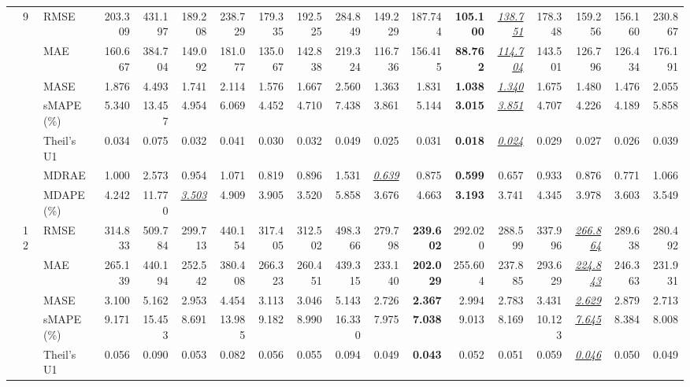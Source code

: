 \begin{table}[!htbp]
{\begin{tabular}{lllrrrrrrrrrrrrrrr}
\cmidrule(lr){2-18}
 & 9 & RMSE & 203.309 & 431.197 & 189.208 & 238.729 & 179.335 & 192.525 & 284.849 & 149.229 & 187.744 & \textbf{105.100} & \underline{\textit{138.751}} & 178.348 & 159.256 & 156.160 & 230.867 \\
 &  & MAE & 160.667 & 384.704 & 149.092 & 181.077 & 135.067 & 142.838 & 219.324 & 116.736 & 156.415 & \textbf{88.762} & \underline{\textit{114.704}} & 143.501 & 126.796 & 126.434 & 176.191 \\
 &  & MASE & 1.876 & 4.493 & 1.741 & 2.114 & 1.576 & 1.667 & 2.560 & 1.363 & 1.831 & \textbf{1.038} & \underline{\textit{1.340}} & 1.675 & 1.480 & 1.476 & 2.055 \\
 &  & sMAPE (\%) & 5.340 & 13.457 & 4.954 & 6.069 & 4.452 & 4.710 & 7.438 & 3.861 & 5.144 & \textbf{3.015} & \underline{\textit{3.851}} & 4.707 & 4.226 & 4.189 & 5.858 \\
 &  & Theil's U1 & 0.034 & 0.075 & 0.032 & 0.041 & 0.030 & 0.032 & 0.049 & 0.025 & 0.031 & \textbf{0.018} & \underline{\textit{0.024}} & 0.029 & 0.027 & 0.026 & 0.039 \\
 &  & MDRAE & 1.000 & 2.573 & 0.954 & 1.071 & 0.819 & 0.896 & 1.531 & \underline{\textit{0.639}} & 0.875 & \textbf{0.599} & 0.657 & 0.933 & 0.876 & 0.771 & 1.066 \\
 &  & MDAPE (\%) & 4.242 & 11.770 & \underline{\textit{3.503}} & 4.909 & 3.905 & 3.520 & 5.858 & 3.676 & 4.663 & \textbf{3.193} & 3.741 & 4.345 & 3.978 & 3.603 & 3.549 \\
\cmidrule(lr){2-18}
 & 12 & RMSE & 314.833 & 509.784 & 299.713 & 440.154 & 317.405 & 312.502 & 498.366 & 279.798 & \textbf{239.602} & 292.020 & 288.599 & 337.996 & \underline{\textit{266.864}} & 289.638 & 280.492 \\
 &  & MAE & 265.139 & 440.194 & 252.542 & 380.408 & 266.323 & 260.451 & 439.315 & 233.140 & \textbf{202.029} & 255.604 & 237.885 & 293.629 & \underline{\textit{224.843}} & 246.363 & 231.931 \\
 &  & MASE & 3.100 & 5.162 & 2.953 & 4.454 & 3.113 & 3.046 & 5.143 & 2.726 & \textbf{2.367} & 2.994 & 2.783 & 3.431 & \underline{\textit{2.629}} & 2.879 & 2.713 \\
 &  & sMAPE (\%) & 9.171 & 15.453 & 8.691 & 13.985 & 9.182 & 8.990 & 16.330 & 7.975 & \textbf{7.038} & 9.013 & 8.169 & 10.123 & \underline{\textit{7.645}} & 8.384 & 8.008 \\
 &  & Theil's U1 & 0.056 & 0.090 & 0.053 & 0.082 & 0.056 & 0.055 & 0.094 & 0.049 & \textbf{0.043} & 0.052 & 0.051 & 0.059 & \underline{\textit{0.046}} & 0.050 & 0.049 \\

\end{tabular}}
\end{table}
